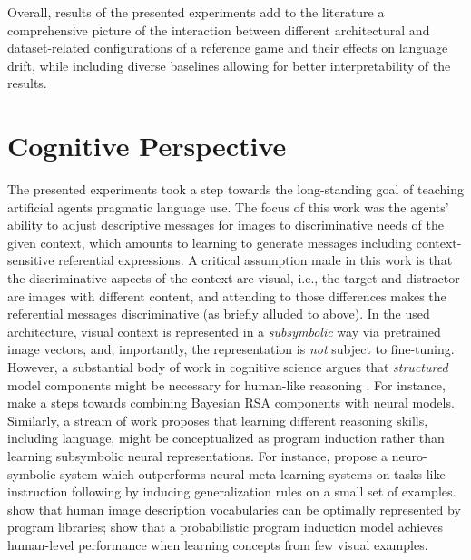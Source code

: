 Overall, results of the presented experiments add to the literature a comprehensive picture of the interaction between different architectural and dataset-related configurations of a reference game and their effects on language drift, while including diverse baselines allowing for better interpretability of the results. 


\section{Cognitive Perspective}
\label{discussion_cog_perspective}
The presented experiments took a step towards the long-standing goal of teaching artificial agents pragmatic language use. The focus of this work was the agents' ability to adjust descriptive messages for images to discriminative needs of the given context, which amounts to learning to generate messages including context-sensitive referential expressions. A critical assumption made in this work is that the discriminative aspects of the context are visual, i.e., the target and distractor are images with different content, and attending to those differences makes the referential messages discriminative (as briefly alluded to above). In the used architecture, visual context is represented in a \emph{subsymbolic} way via pretrained image vectors, and, importantly, the representation is \emph{not} subject to fine-tuning. However, a substantial body of work in cognitive science argues that \emph{structured} model components might be necessary for human-like reasoning \parencite[e.g.,][]{tenenbaum2011grow, lake2017building}. For instance, \cite{monroe2015learning} make a steps towards combining Bayesian RSA components with neural models.
Similarly, a stream of work proposes that learning different reasoning skills, including language, might be conceptualized as program induction rather than learning subsymbolic neural representations. For instance, \cite{nye2020learning} propose a neuro-symbolic system which outperforms neural meta-learning systems on tasks like instruction following by inducing generalization rules on a small set of examples. \cite{wong2022identifying} show that human image description vocabularies can be optimally represented by program libraries; \cite{lake2015human} show that a probabilistic program induction model achieves human-level performance when learning concepts from few visual examples. 


